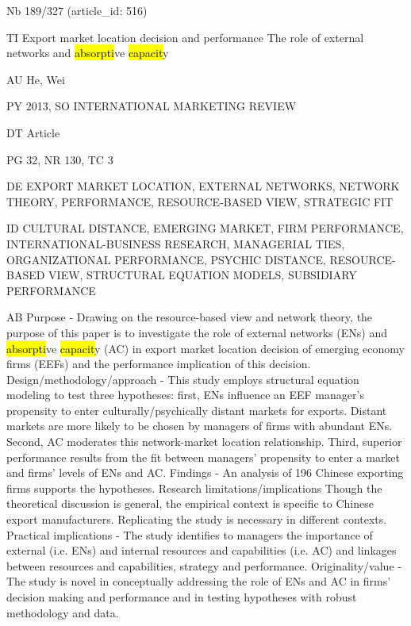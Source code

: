 \documentclass[a4paper]{article}
\begin{document}
\vspace*{-2cm}
Nb \tabto{0cm}189/327 (article\_id: 516)\par
TI \tabto{0cm}Export market location decision and performance The role of external networks and \hl{absorpti}ve \hl{capacit}y\par
AU \tabto{0cm}He, Wei\par
PY \tabto{0cm}2013, SO INTERNATIONAL MARKETING REVIEW\par
DT \tabto{0cm}Article\par
PG \tabto{0cm}32, NR 130, TC 3\par
DE \tabto{0cm}EXPORT MARKET LOCATION, EXTERNAL NETWORKS, NETWORK THEORY, PERFORMANCE, RESOURCE-BASED VIEW, STRATEGIC FIT\par
ID \tabto{0cm}CULTURAL DISTANCE, EMERGING MARKET, FIRM PERFORMANCE, INTERNATIONAL-BUSINESS RESEARCH, MANAGERIAL TIES, ORGANIZATIONAL PERFORMANCE, PSYCHIC DISTANCE, RESOURCE-BASED VIEW, STRUCTURAL EQUATION MODELS, SUBSIDIARY PERFORMANCE\par
AB \tabto{0cm}Purpose - Drawing on the resource-based view and network theory, the purpose of this paper is to investigate the role of external networks (ENs) and \hl{absorpti}ve \hl{capacit}y (AC) in export market location decision of emerging economy firms (EEFs) and the performance implication of this decision.
Design/methodology/approach - This study employs structural equation modeling to test three hypotheses: first, ENs influence an EEF manager's propensity to enter culturally/psychically distant markets for exports. Distant markets are more likely to be chosen by managers of firms with abundant ENs. Second, AC moderates this network-market location relationship. Third, superior performance results from the fit between managers' propensity to enter a market and firms' levels of ENs and AC.
Findings - An analysis of 196 Chinese exporting firms supports the hypotheses.
Research limitations/implications Though the theoretical discussion is general, the empirical context is specific to Chinese export manufacturers. Replicating the study is necessary in different contexts.
Practical implications - The study identifies to managers the importance of external (i.e. ENs) and internal resources and capabilities (i.e. AC) and linkages between resources and capabilities, strategy and performance.
Originality/value - The study is novel in conceptually addressing the role of ENs and AC in firms' decision making and performance and in testing hypotheses with robust methodology and data.\par
\clearpage
\end{document}
